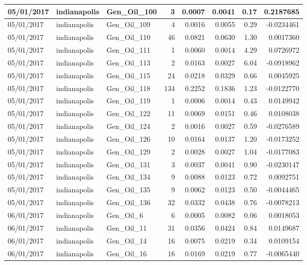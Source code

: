 \documentclass[
  letterpaper,
  DIV=11,
  numbers=noendperiod]{scrartcl}
\begin{document}
\begin{tabular}{l|l|l|r|r|r|r|r}
\hline
05/01/2017 & indianapolis & Gen\_Oil\_100 & 3 & 0.0007 & 0.0041 & 0.17 & 0.2187685\\
\hline
05/01/2017 & indianapolis & Gen\_Oil\_109 & 4 & 0.0016 & 0.0055 & 0.29 & -0.0234461\\
\hline
05/01/2017 & indianapolis & Gen\_Oil\_110 & 46 & 0.0821 & 0.0630 & 1.30 & 0.0017360\\
\hline
05/01/2017 & indianapolis & Gen\_Oil\_111 & 1 & 0.0060 & 0.0014 & 4.29 & 0.0726972\\
\hline
05/01/2017 & indianapolis & Gen\_Oil\_113 & 2 & 0.0163 & 0.0027 & 6.04 & -0.0918962\\
\hline
05/01/2017 & indianapolis & Gen\_Oil\_115 & 24 & 0.0218 & 0.0329 & 0.66 & 0.0045925\\
\hline
05/01/2017 & indianapolis & Gen\_Oil\_118 & 134 & 0.2252 & 0.1836 & 1.23 & -0.0122770\\
\hline
05/01/2017 & indianapolis & Gen\_Oil\_119 & 1 & 0.0006 & 0.0014 & 0.43 & 0.0149942\\
\hline
05/01/2017 & indianapolis & Gen\_Oil\_122 & 11 & 0.0069 & 0.0151 & 0.46 & 0.0108038\\
\hline
05/01/2017 & indianapolis & Gen\_Oil\_124 & 2 & 0.0016 & 0.0027 & 0.59 & -0.0276589\\
\hline
05/01/2017 & indianapolis & Gen\_Oil\_126 & 10 & 0.0164 & 0.0137 & 1.20 & -0.0173252\\
\hline
05/01/2017 & indianapolis & Gen\_Oil\_129 & 2 & 0.0028 & 0.0027 & 1.04 & -0.0177083\\
\hline
05/01/2017 & indianapolis & Gen\_Oil\_131 & 3 & 0.0037 & 0.0041 & 0.90 & -0.0230147\\
\hline
05/01/2017 & indianapolis & Gen\_Oil\_134 & 9 & 0.0088 & 0.0123 & 0.72 & 0.0092751\\
\hline
05/01/2017 & indianapolis & Gen\_Oil\_135 & 9 & 0.0062 & 0.0123 & 0.50 & -0.0044465\\
\hline
05/01/2017 & indianapolis & Gen\_Oil\_136 & 32 & 0.0332 & 0.0438 & 0.76 & -0.0078213\\
\hline
06/01/2017 & indianapolis & Gen\_Oil\_6 & 6 & 0.0005 & 0.0082 & 0.06 & 0.0018053\\
\hline
06/01/2017 & indianapolis & Gen\_Oil\_11 & 31 & 0.0356 & 0.0424 & 0.84 & 0.0149687\\
\hline
06/01/2017 & indianapolis & Gen\_Oil\_14 & 16 & 0.0075 & 0.0219 & 0.34 & 0.0109154\\
\hline
06/01/2017 & indianapolis & Gen\_Oil\_16 & 16 & 0.0169 & 0.0219 & 0.77 & -0.0065440\\

\end{tabular}
\end{document}
